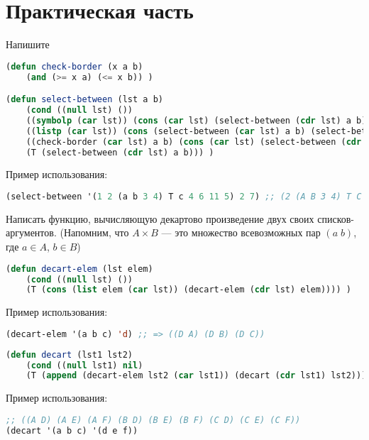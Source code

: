 \documentclass[a4paper,oneside,12pt]{extreport}
\begin{document}


\section*{Практическая часть}

\begin{task}
    Напишите 

    \begin{lstlisting}[language=Lisp]
(defun check-border (x a b)
    (and (>= x a) (<= x b)) )

(defun select-between (lst a b)
    (cond ((null lst) ())
    ((symbolp (car lst)) (cons (car lst) (select-between (cdr lst) a b)))
    ((listp (car lst)) (cons (select-between (car lst) a b) (select-between (cdr lst) a b)))
    ((check-border (car lst) a b) (cons (car lst) (select-between (cdr lst) a b)))
    (T (select-between (cdr lst) a b))) )
    \end{lstlisting}

    Пример использования:
    \begin{lstlisting}[language=Lisp] 
(select-between '(1 2 (a b 3 4) T c 4 6 11 5) 2 7) ;; (2 (A B 3 4) T C 4 6 5)
    \end{lstlisting}
\end{task}

\begin{task}
	Написать функцию, вычисляющую декартово произведение двух своих списков-аргументов.
	(Напомним, что $A\times B$ — это множество всевозможных пар $(a\;b)$, где $a\in A$, $b\in B$)

    \begin{lstlisting}[language=Lisp]
(defun decart-elem (lst elem)
	(cond ((null lst) ())
	(T (cons (list elem (car lst)) (decart-elem (cdr lst) elem)))) )
    \end{lstlisting}


    Пример использования:
    \begin{lstlisting}[language=Lisp]    
(decart-elem '(a b c) 'd) ;; => ((D A) (D B) (D C))
    \end{lstlisting}

    \begin{lstlisting}[language=Lisp]
(defun decart (lst1 lst2)
	(cond ((null lst1) nil)
	(T (append (decart-elem lst2 (car lst1)) (decart (cdr lst1) lst2)))) )
    \end{lstlisting}

    Пример использования:
    \begin{lstlisting}[language=Lisp]   
;; ((A D) (A E) (A F) (B D) (B E) (B F) (C D) (C E) (C F))
(decart '(a b c) '(d e f))  
    \end{lstlisting}
\end{task}
\end{document}
